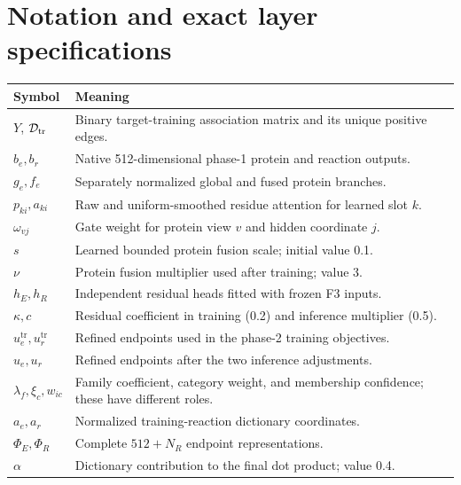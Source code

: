\section{Notation and exact layer specifications}
\label{app:v4-layers}
\begin{longtable}{p{}p{}}
\toprule
Symbol & Meaning\\
\midrule
\endhead
$Y$, $\mathcal{D}_{\mathrm{tr}}$ & Binary target-training association matrix and its unique positive edges.\\
$b_e,b_r$ & Native 512-dimensional phase-1 protein and reaction outputs.\\
$g_e,f_e$ & Separately normalized global and fused protein branches.\\
$p_{ki},a_{ki}$ & Raw and uniform-smoothed residue attention for learned slot $k$.\\
$\omega_{vj}$ & Gate weight for protein view $v$ and hidden coordinate $j$.\\
$s$ & Learned bounded protein fusion scale; initial value 0.1.\\
$\nu$ & Protein fusion multiplier used after training; value 3.\\
$h_E,h_R$ & Independent residual heads fitted with frozen F3 inputs.\\
$\kappa,c$ & Residual coefficient in training (0.2) and inference multiplier (0.5).\\
$u_e^{\mathrm{tr}},u_r^{\mathrm{tr}}$ & Refined endpoints used in the phase-2 training objectives.\\
$u_e,u_r$ & Refined endpoints after the two inference adjustments.\\
$\lambda_f,\xi_c,w_{ic}$ & Family coefficient, category weight, and membership confidence; these have different roles.\\
$a_e,a_r$ & Normalized training-reaction dictionary coordinates.\\
$\Phi_E,\Phi_R$ & Complete $512+N_R$ endpoint representations.\\
$\alpha$ & Dictionary contribution to the final dot product; value 0.4.\\
\bottomrule
\end{longtable}

